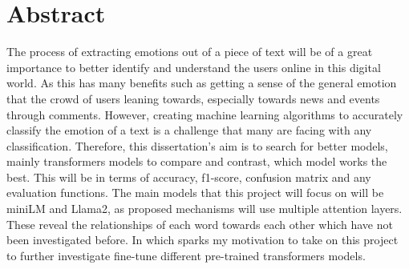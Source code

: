 
\chapter*{Abstract}

The process of extracting emotions out of a piece of text will be of a great importance to better identify and
understand the users online in this digital world. 
As this has many benefits such as getting a sense of the general emotion that the crowd of users leaning towards, 
especially towards news and events through comments.
However, creating machine learning algorithms to accurately classify the emotion of a text is a challenge that
many are facing with any classification.
Therefore, this dissertation's aim is to search for better models, mainly transformers models to compare and contrast,
which model works the best.
This will be in terms of accuracy, f1-score, confusion matrix and any evaluation functions.
The main models that this project will focus on will be miniLM and Llama2, 
as proposed mechanisms will use multiple attention layers. 
These reveal the relationships of each word towards each other which have not been investigated before.
In which sparks my motivation to take on this project to further investigate fine-tune different pre-trained transformers
models.